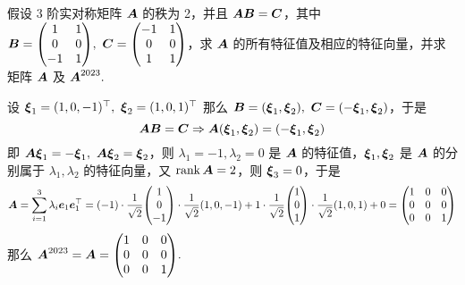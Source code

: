 \begin{example}
    假设 3 阶实对称矩阵 $\vb*{A}$ 的秩为 2，并且 $\vb*{AB}=\vb*{C}$，其中 $\vb*{B}=\mqty(1&1\\0&0\\-1&1),~\vb*{C}=\mqty(-1&1\\0&0\\1&1)$，求 $\vb*{A}$ 的所有特征值及相应的特征向量，并求矩阵 $\vb*{A}$ 及 $\vb*{A}^{2023}.$
\end{example}
\begin{solution}
    设 $\vb*{\xi}_1=(1,0,-1)^\top,~\vb*{\xi}_2=(1,0,1)^\top$ 那么 $\vb*{B}=(\vb*{\xi}_1,\vb*{\xi}_2),~\vb*{C}=(-\vb*{\xi}_1,\vb*{\xi}_2)$，于是 $$\vb*{AB}=\vb*{C}\Rightarrow \vb*{A}(\vb*{\xi}_1,\vb*{\xi}_2)=(-\vb*{\xi}_1,\vb*{\xi}_2)$$
    即 $\vb*{A\xi}_1=-\vb*{\xi}_1,~\vb*{A\xi}_2=\vb*{\xi}_2$，则 $\lambda_1=-1,\lambda_2=0$ 是 $\vb*{A}$ 的特征值，$\vb*{\xi}_1,\vb*{\xi}_2$ 是 $\vb*{A}$ 的分别属于 $\lambda_1,\lambda_2$ 的特征向量，又 $\rank\vb*{A}=2$，则 $\vb*{\xi}_3=0$，于是
    $$\vb*{A}=\sum_{i=1}^{3}\lambda_i\vb*{e}_1\vb*{e}_1^\top=(-1)\cdot\dfrac{1}{\sqrt{2}}\mqty(1\\0\\-1)\cdot\dfrac{1}{\sqrt{2}}(1,0,-1)+1\cdot\dfrac{1}{\sqrt{2}}\mqty(1\\0\\1)\cdot\dfrac{1}{\sqrt{2}}(1,0,1)+0=\mqty(1&0&0\\0&0&0\\0&0&1)$$
    那么 $\vb*{A}^{2023}=\vb*{A}=\mqty(1&0&0\\0&0&0\\0&0&1).$
\end{solution}

